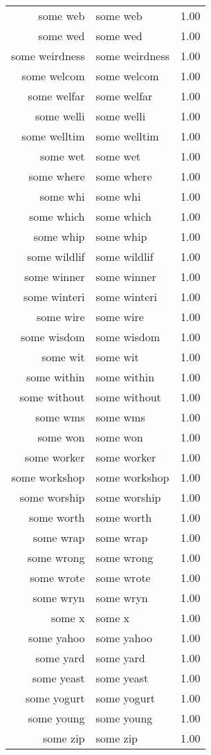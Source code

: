 \begin{table}[ht]
\begin{tabular}{rlr}
  some web & some web & 1.00 \\ 
  some wed & some wed & 1.00 \\ 
  some weirdness & some weirdness & 1.00 \\ 
  some welcom & some welcom & 1.00 \\ 
  some welfar & some welfar & 1.00 \\ 
  some welli & some welli & 1.00 \\ 
  some welltim & some welltim & 1.00 \\ 
  some wet & some wet & 1.00 \\ 
  some where & some where & 1.00 \\ 
  some whi & some whi & 1.00 \\ 
  some which & some which & 1.00 \\ 
  some whip & some whip & 1.00 \\ 
  some wildlif & some wildlif & 1.00 \\ 
  some winner & some winner & 1.00 \\ 
  some winteri & some winteri & 1.00 \\ 
  some wire & some wire & 1.00 \\ 
  some wisdom & some wisdom & 1.00 \\ 
  some wit & some wit & 1.00 \\ 
  some within & some within & 1.00 \\ 
  some without & some without & 1.00 \\ 
  some wms & some wms & 1.00 \\ 
  some won & some won & 1.00 \\ 
  some worker & some worker & 1.00 \\ 
  some workshop & some workshop & 1.00 \\ 
  some worship & some worship & 1.00 \\ 
  some worth & some worth & 1.00 \\ 
  some wrap & some wrap & 1.00 \\ 
  some wrong & some wrong & 1.00 \\ 
  some wrote & some wrote & 1.00 \\ 
  some wryn & some wryn & 1.00 \\ 
  some x & some x & 1.00 \\ 
  some yahoo & some yahoo & 1.00 \\ 
  some yard & some yard & 1.00 \\ 
  some yeast & some yeast & 1.00 \\ 
  some yogurt & some yogurt & 1.00 \\ 
  some young & some young & 1.00 \\ 
  some zip & some zip & 1.00 \\ 
   \hline
\end{tabular}
\end{table}
